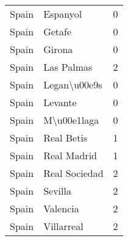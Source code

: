\begin{tabular}{llr}
Spain   &                  Espanyol &        0 \\
Spain   &                    Getafe &        0 \\
Spain   &                    Girona &        0 \\
Spain   &                Las Palmas &        2 \\
Spain   &              Legan\textbackslash u00e9s &        0 \\
Spain   &                   Levante &        0 \\
Spain   &               M\textbackslash u00e1laga &        0 \\
Spain   &                Real Betis &        1 \\
Spain   &               Real Madrid &        1 \\
Spain   &             Real Sociedad &        2 \\
Spain   &                   Sevilla &        2 \\
Spain   &                  Valencia &        2 \\
Spain   &                Villarreal &        2 \\
\bottomrule
\end{tabular}
